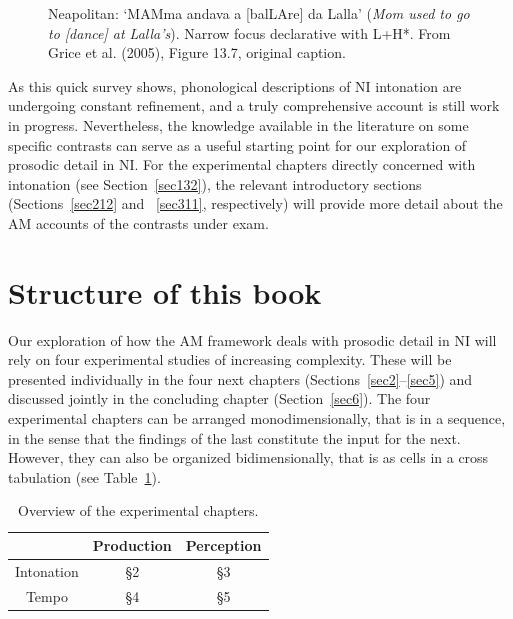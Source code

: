 \begin{figure}
\centering
{}
\caption{Neapolitan: `MAMma andava a [balLAre] da Lalla' (\textit{Mom used to go to [dance] at Lalla's}). Narrow focus declarative with L+H*. From Grice et al. (2005), Figure 13.7, original caption.}
\label{fig103}\end{figure}

As this quick survey shows, phonological descriptions of NI intonation are undergoing constant refinement, and a truly comprehensive account is still work in progress. Nevertheless, the knowledge available in the literature on some specific contrasts can serve as a useful starting point for our exploration of prosodic detail in NI. For the experimental chapters directly concerned with intonation (see Section~\ref{sec132}), the relevant introductory sections (Sections~\ref{sec212} and ~\ref{sec311}, respectively) will provide more detail about the AM accounts of the contrasts under exam.

\section{Structure of this book}\label{sec13}
Our exploration of how the AM framework deals with prosodic detail in NI will rely on four experimental studies of increasing complexity. These will be presented individually in the four next chapters (Sections~\ref{sec2}--\ref{sec5}) and discussed jointly in the concluding chapter (Section~\ref{sec6}). The four experimental chapters can be arranged monodimensionally, that is in a sequence, in the sense that the findings of the last constitute the input for the next. However, they can also be organized bidimensionally, that is as cells in a cross tabulation (see Table~\ref{tab11}).

\begin{table}[h]
\centering
\begin{tabular}{c | c c}
& Production & Perception\\
\hline
Intonation & §2 & §3\\
Tempo & §4 & §5
\end{tabular}
\caption{Overview of the experimental chapters.}
\label{tab11}\end{table}

